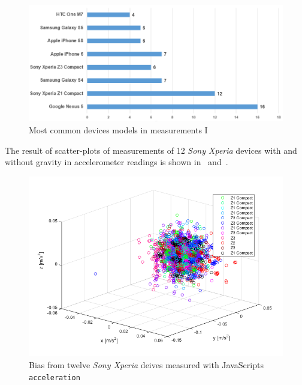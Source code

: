 \begin{figure}[H]
	\centering
	\includegraphics[scale=0.5]{img/measure1-devices}
	\caption{Most common devices models in measurements I}
	\label{fig:measure1-topDevices}
\end{figure}
The result of scatter-plots of measurements of 12 \textit{Sony Xperia} devices with and without gravity in accelerometer readings is shown in~ and~.
\begin{figure}[H]
	\centering
	\includegraphics[scale=0.6]{img/res-measure1-scatter-notG}
	\caption{Bias from twelve \textit{Sony Xperia} deives measured with JavaScripts \texttt{acceleration}}
	\label{fig:scatter-withoutGrav}
\end{figure}

